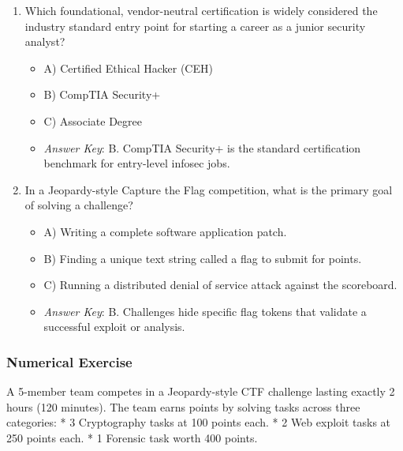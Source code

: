 \documentclass[12pt,openany]{book}
\begin{document}
\begin{enumerate}

  \item Which foundational, vendor-neutral certification is widely considered the industry standard entry point for starting a career as a junior security analyst?

\begin{itemize}

  \item A) Certified Ethical Hacker (CEH)

  \item B) CompTIA Security+

  \item C) Associate Degree

  \item \textit{Answer Key}: B. CompTIA Security+ is the standard certification benchmark for entry-level infosec jobs.

\end{itemize}

  \item In a Jeopardy-style Capture the Flag competition, what is the primary goal of solving a challenge?

\begin{itemize}

  \item A) Writing a complete software application patch.

  \item B) Finding a unique text string called a flag to submit for points.

  \item C) Running a distributed denial of service attack against the scoreboard.

  \item \textit{Answer Key}: B. Challenges hide specific flag tokens that validate a successful exploit or analysis.

\end{itemize}

\end{enumerate}


\subsubsection*{Numerical Exercise}


A 5-member team competes in a Jeopardy-style CTF challenge lasting exactly 2 hours (120 minutes). The team earns points by solving tasks across three categories:
* 3 Cryptography tasks at 100 points each.
* 2 Web exploit tasks at 250 points each.
* 1 Forensic task worth 400 points.
\end{document}
